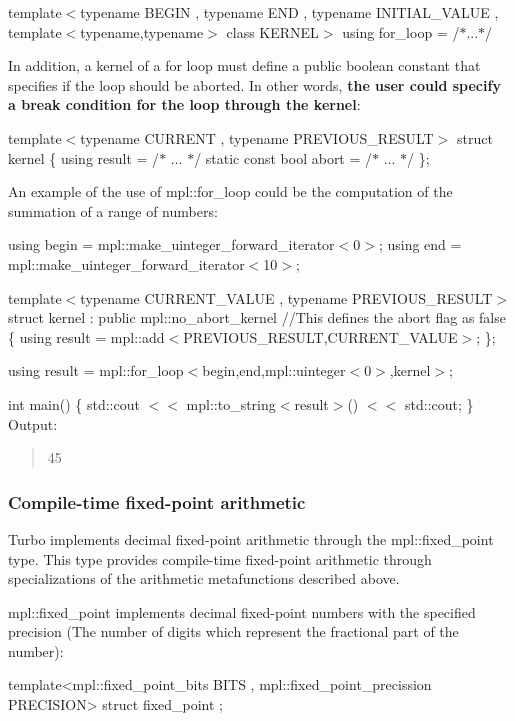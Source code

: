 template$<$typename B\+E\+G\+I\+N , typename E\+N\+D , typename I\+N\+I\+T\+I\+A\+L\+\_\+\+V\+A\+L\+U\+E , template$<$typename,typename$>$ class K\+E\+R\+N\+E\+L$>$ using for\+\_\+loop = /$\ast$...$\ast$/

In addition, a kernel of a for loop must define a public boolean constant that specifies if the loop should be aborted. In other words, {\bfseries the user could specify a break condition for the loop through the kernel}\+:

template$<$typename C\+U\+R\+R\+E\+N\+T , typename P\+R\+E\+V\+I\+O\+U\+S\+\_\+\+R\+E\+S\+U\+L\+T$>$ struct kernel \{ using result = /$\ast$ ... $\ast$/ static const bool abort = /$\ast$ ... $\ast$/ \};

An example of the use of {\ttfamily mpl\+::for\+\_\+loop} could be the computation of the summation of a range of numbers\+:

using begin = mpl\+::make\+\_\+uinteger\+\_\+forward\+\_\+iterator$<$0$>$; using end = mpl\+::make\+\_\+uinteger\+\_\+forward\+\_\+iterator$<$10$>$;

template$<$typename C\+U\+R\+R\+E\+N\+T\+\_\+\+V\+A\+L\+U\+E , typename P\+R\+E\+V\+I\+O\+U\+S\+\_\+\+R\+E\+S\+U\+L\+T$>$ struct kernel \+: public mpl\+::no\+\_\+abort\+\_\+kernel //\+This defines the abort flag as false \{ using result = mpl\+::add$<$\+P\+R\+E\+V\+I\+O\+U\+S\+\_\+\+R\+E\+S\+U\+L\+T,\+C\+U\+R\+R\+E\+N\+T\+\_\+\+V\+A\+L\+U\+E$>$; \};

using result = mpl\+::for\+\_\+loop$<$begin,end,mpl\+::uinteger$<$0$>$,kernel$>$;

int main() \{ std\+::cout $<$$<$ mpl\+::to\+\_\+string$<$result$>$() $<$$<$ std\+::cout; \} Output\+: \begin{quote}
45 \end{quote}


\subsubsection*{Compile-\/time fixed-\/point arithmetic}

Turbo implements decimal fixed-\/point arithmetic through the {\ttfamily mpl\+::fixed\+\_\+point} type. This type provides compile-\/time fixed-\/point arithmetic through specializations of the arithmetic metafunctions described above.

{\ttfamily mpl\+::fixed\+\_\+point} implements decimal fixed-\/point numbers with the specified precision (The number of digits which represent the fractional part of the number)\+: \begin{DoxyVerb}template<mpl::fixed_point_bits BITS , mpl::fixed_point_precission PRECISION>
struct fixed_point {};
\end{DoxyVerb}


